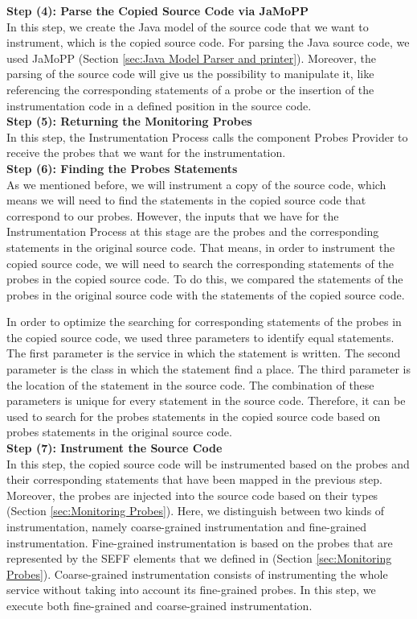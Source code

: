\textbf{Step (4): Parse the Copied Source Code via JaMoPP}\\
In this step, we create the Java model of the source code that we want to instrument, which is the copied source code. For parsing the Java source code, we used JaMoPP (Section \ref{sec:Java Model Parser and printer}). Moreover, the parsing of the source code will give us the possibility to manipulate it, like referencing the corresponding statements of a probe or the insertion of the instrumentation code in a defined position in the source code.\\

\textbf{Step (5): Returning the Monitoring Probes}\\
In this step, the Instrumentation Process calls the component Probes Provider to receive the probes that we want for the instrumentation.\\

\textbf{Step (6): Finding the Probes Statements}\\
As we mentioned before, we will instrument a copy of the source code, which means we will need to find the statements in the copied source code that correspond to our probes. However, the inputs that we have for the Instrumentation Process at this stage are the probes and the corresponding statements in the original source code. That means, in order to instrument the copied source code, we will need to search the corresponding statements of the probes in the copied source code. To do this, we compared the statements of the probes in the original source code with the statements of the copied source code. 

In order to optimize the searching for corresponding statements of the probes in the copied source code, we used three parameters to identify equal statements. The first parameter is the service in which the statement is written. The second parameter is the class in which the statement find a place. The third parameter is the location of the statement in the source code. The combination of these parameters is unique for every statement in the source code. Therefore, it can be used to search for the probes statements in the copied source code based on probes statements in the original source code. \\

\textbf{Step (7): Instrument the Source Code}\\
In this step, the copied source code will be instrumented based on the probes and their corresponding statements that have been mapped in the previous step. Moreover, the probes are injected into the source code based on their types (Section \ref{sec:Monitoring Probes}).  Here, we distinguish between two kinds of instrumentation, namely coarse-grained instrumentation and fine-grained instrumentation. Fine-grained instrumentation is based on the probes that are represented by the SEFF elements that we defined in (Section \ref{sec:Monitoring Probes}). Coarse-grained instrumentation consists of instrumenting the whole service without taking into account its fine-grained probes. In this step, we execute both fine-grained and coarse-grained instrumentation. \\

